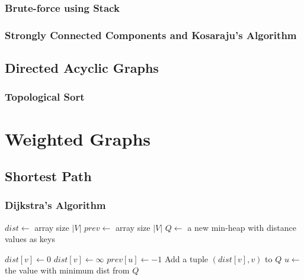 \documentclass{report}
\begin{document}
\subsection{Brute-force using Stack}

\subsection{Strongly Connected Components and Kosaraju's Algorithm}

\section{Directed Acyclic Graphs}

\subsection{Topological Sort}


\chapter{Weighted Graphs}

\section{Shortest Path}

\subsection{Dijkstra's Algorithm}

\noindent \hrulefill
\begin{algorithmic}[1]
   
    \State $dist \gets$ array size $|V|$
    \State $prev \gets$ array size $|V|$
    \State $Q \gets$ a new min-heap with distance values as keys
    \item[]
        $dist[v] \gets 0$
      \EndIf
        $dist[v] \gets \infty$
      \EndIf
      \State $prev[u] \gets -1$
      \State Add a tuple $(dist[v], v)$ to $Q$
        \State $u \gets$ the value with minimum dist from $Q$ 
      \EndWhile
    \EndFor
  \EndFunction
\end{algorithmic}
\noindent \hrulefill
\end{document}

